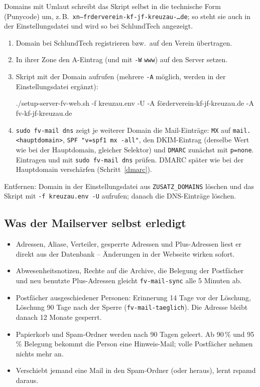 \documentclass[a4paper,fontsize=10pt]{scrartcl}
\newcommand*{\cmd}[1]{\texttt{#1}}
\newcommand*{\erledigt}{\makebox[1.4em][l]{\setlength{\fboxsep}{0pt}\fbox{\rule{0pt}{0.7em}\hspace{0.7em}}}}
\begin{document}
Domains mit Umlaut schreibt das Skript selbst in die technische Form (Punycode) um,
z.\,B.\ \cmd{xn--frderverein-kf-jf-kreuzau-…de}; so steht sie auch in der
Einstellungsdatei und wird so bei SchlundTech angezeigt.

\begin{enumerate}
  \item \erledigt Domain bei SchlundTech registrieren bzw.\ auf den Verein übertragen.
  \item \erledigt In ihrer Zone den A-Eintrag (und mit \cmd{-W} \cmd{www}) auf den Server
        setzen.
  \item \erledigt Skript mit der Domain aufrufen (mehrere \cmd{-A} möglich, werden in der
        Einstellungsdatei ergänzt):
\begin{befehl}
./setup-server-fv-web.sh -f kreuzau.env -U -A förderverein-kf-jf-kreuzau.de -A fv-kf-jf-kreuzau.de
\end{befehl}
  \item \erledigt \cmd{sudo fv-mail dns} zeigt je weiterer Domain die Mail-Einträge:
        \cmd{MX} auf \cmd{mail.<hauptdomain>}, \cmd{SPF "v=spf1 mx -all"}, den
        DKIM-Eintrag (derselbe Wert wie bei der Hauptdomain, gleicher Selektor) und
        \cmd{DMARC} zunächst mit \cmd{p=none}. Eintragen und mit \cmd{sudo fv-mail dns}
        prüfen. DMARC später wie bei der Hauptdomain verschärfen
        (Schritt~\ref{dmarc}).
\end{enumerate}

Entfernen: Domain in der Einstellungsdatei aus \cmd{ZUSATZ\_DOMAINS} löschen und das
Skript mit \cmd{-f kreuzau.env -U} aufrufen; danach die DNS-Einträge löschen.

\subsection{Was der Mailserver selbst erledigt}

\begin{itemize}
  \item Adressen, Aliase, Verteiler, gesperrte Adressen und Plus-Adressen liest er
        direkt aus der Datenbank -- Änderungen in der Webseite wirken sofort.
  \item Abwesenheitsnotizen, Rechte auf die Archive, die Belegung der Postfächer und
        neu benutzte Plus-Adressen gleicht \cmd{fv-mail-sync} alle 5 Minuten ab.
  \item Postfächer ausgeschiedener Personen: Erinnerung 14 Tage vor der Löschung,
        Löschung 90 Tage nach der Sperre (\cmd{fv-mail-taeglich}). Die Adresse bleibt
        danach 12 Monate gesperrt.
  \item Papierkorb und Spam-Ordner werden nach 90 Tagen geleert. Ab 90\,\% und 95\,\%
        Belegung bekommt die Person eine Hinweis-Mail; volle Postfächer nehmen nichts
        mehr an.
  \item Verschiebt jemand eine Mail in den Spam-Ordner (oder heraus), lernt rspamd
        daraus.
\end{itemize}
\end{document}

